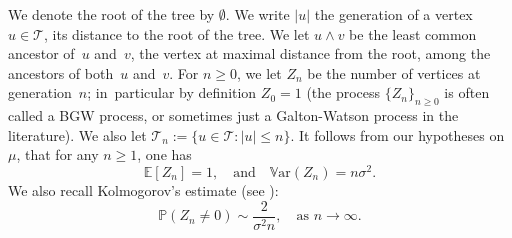\documentclass[JEP,XML,SOM,Unicode,NoFloatCountersInSection,published]{cedram}
\theoremstyle{plain}
\theoremstyle{definition}
\newcommand{\1}{{\text{\Large $\mathfrak 1$}}}
\begin{document}
We denote the root of the tree by $\emptyset$. We write $|u|$ the generation of a vertex $u\in \mathcal T$, \ie its distance to the root of the tree.
We let $u\wedge v$ be the least common ancestor of~$u$ and~$v$, \ie the vertex at maximal distance from the root, among the ancestors of
both~$u$ and~$v$. For $n\ge 0$, we let $Z_n$ be the number of vertices at generation~$n$; in~particular by definition $Z_0= 1$ (the process $\{Z_n\}_{n\ge 0}$ is often called a BGW process, or sometimes just a Galton-Watson process in the literature). We also let \hbox{$\mathcal T_n:=\{u\in \mathcal T:|u|\le n\}$}.
It follows from our hypotheses on $\mu$, that for any $n\ge 1$, one has
\begin{equation}\label{Zn}
\mathbb E[Z_n] = 1, \quad \text{and}\quad \mathbb V\text{ar}(Z_n) = n\sigma^2.
\end{equation}
We also recall Kolmogorov's estimate (see \cite[Th.\,1 p.\,19]{AN}):
\begin{equation}\label{Kol}
\mathbb P(Z_n\neq 0) \sim \frac{2}{\sigma^2 n }, \quad \text{as }n\to \infty.
\end{equation}
\end{document}
